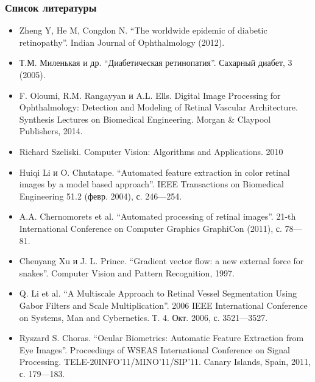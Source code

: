 \documentclass{beamer}
\begin{document}
\begin{frame}
\frametitle{Список литературы}
	\scriptsize{


	\begin{itemize}
		\item Zheng Y, He M, Congdon N. “The worldwide epidemic of diabetic retinopathy”. Indian Journal of Ophthalmology (2012).
		\item Т.М. Миленькая и др. “Диабетическая ретинопатия”. Сахарный диабет, 3 (2005).
		\item F. Oloumi, R.M. Rangayyan и A.L. Ells. Digital Image Processing for Ophthalmology: Detection and Modeling of Retinal Vascular Architecture. Synthesis Lectures on
		Biomedical Engineering. Morgan \& Claypool Publishers, 2014.
		\item Richard Szeliski. Computer Vision: Algorithms and Applications. 2010
		\item Huiqi Li и O. Chutatape. “Automated feature extraction in color retinal images by	a model based approach”. IEEE Transactions on Biomedical Engineering 51.2
		(февр. 2004), с. 246—254.
		\item A.A. Chernomorets et al. “Automated processing of retinal images”. 21-th	International Conference on Computer Graphics GraphiCon (2011), с. 78—81.
		\item Chenyang Xu и J. L. Prince. “Gradient vector flow: a new external force for snakes”. Computer Vision and Pattern Recognition, 1997.
		\item Q. Li et al. “A Multiscale Approach to Retinal Vessel Segmentation Using Gabor Filters and Scale Multiplication”. 2006 IEEE International Conference on Systems, Man and Cybernetics. Т. 4. Окт. 2006, с. 3521—3527. 
		\item Ryszard S. Choras. “Ocular Biometrics: Automatic Feature Extraction from	Eye Images”. Proceedings of WSEAS International Conference on Signal Processing. TELE-20INFO’11/MINO’11/SIP’11. Canary Islands, Spain, 2011, с. 179—183.
\end{itemize}}
\end{frame}
\end{document}
